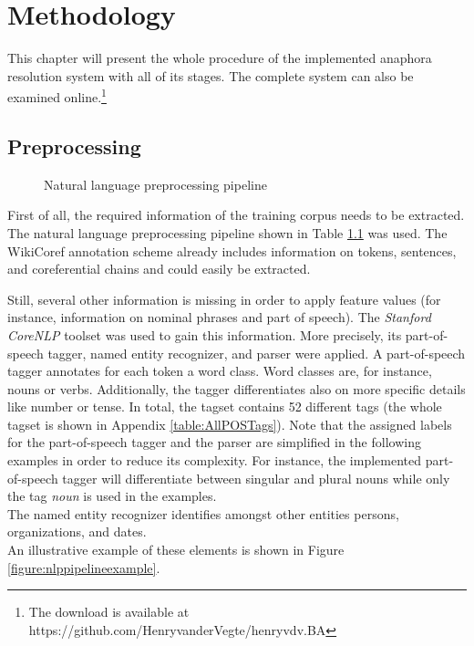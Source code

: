 \chapter{Methodology}
\label{sec:Methodology}
This chapter will present the whole procedure of the implemented anaphora resolution system with all of its stages. The complete system can also be examined online.\footnote{The download is available at https://github.com/HenryvanderVegte/henryvdv.BA}

\section{Preprocessing}
\label{preprocessingSection}
\begin{figure}[h]
	\centering

	\caption{Natural language preprocessing pipeline}
	\label{figure:nlppipeline}
\end{figure}

First of all, the required information of the training corpus needs to be extracted. The natural language preprocessing pipeline shown in Table \ref{figure:nlppipeline} was used.  The WikiCoref annotation scheme already includes information on tokens, sentences, and coreferential chains and could easily be extracted.

Still, several other information is missing in order to apply feature values (for instance, information on nominal phrases and part of speech). The \textit{Stanford CoreNLP} toolset \citep{manning-EtAl:2014:P14-5} was used to gain this information. More precisely, its part-of-speech tagger, named entity recognizer, and parser were applied. 
A part-of-speech tagger annotates for each token a word class. Word classes are, for instance, nouns or verbs. Additionally, the tagger differentiates also on more specific details like number or tense. In total, the tagset contains 52 different tags (the whole tagset is shown in Appendix \ref{table:AllPOSTags}). Note that the assigned labels for the part-of-speech tagger and the parser are simplified in the following examples in order to reduce its complexity. For instance, the implemented part-of-speech tagger will differentiate between singular and plural nouns while only the tag \textit{noun} is used in the examples.\\
The named entity recognizer identifies amongst other entities persons, organizations, and dates. \\
An illustrative example of these elements is shown in Figure \ref{figure:nlppipelineexample}. 


